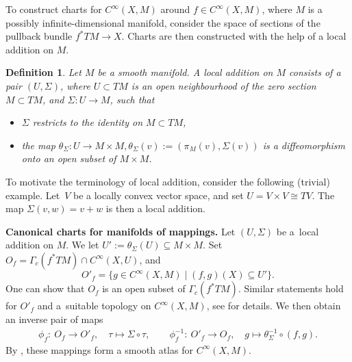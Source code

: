 \documentclass[pdftex]{sigma}
\numberwithin{equation}{section}
\newtheorem{Definition}[Theorem]{Definition}
\newtheorem{setup}[Theorem]{}
\begin{document}
To construct charts for $C^{\infty}(X,M)$ around $f \in C^{\infty}(X,M)$, where $M$ is a possibly infinite-dimensional manifold, consider the space of sections of the pullback bundle $f^{*}TM \rightarrow X$. Charts are then constructed with the help of a local addition on $M$.

\begin{Definition}%
 Let $M$ be a smooth manifold.
 A \emph{local addition} on $M$ consists of a pair $(U,\Sigma)$, where $U \subset TM$ is an open neighbourhood of the zero section $M \subset TM$, and $\Sigma \colon U \rightarrow M$,
 such that
 \begin{itemize}\itemsep=0pt
 \item $\Sigma$ restricts to the identity on $M \subset TM$,
 \item the map $\theta_\Sigma \colon U \rightarrow M \times M, \theta_\Sigma (v) := (\pi_M(v), \Sigma(v))$ is a diffeomorphism onto an open subset of $M \times M$.
 \end{itemize}
\end{Definition}

To motivate the terminology of local addition, consider the following (trivial) example. Let~$V$ be a locally convex vector space, and set $U = V \times V \cong TV$. The map $\Sigma (v,w) = v+w$ is then a local addition.


{\bf Canonical charts for manifolds of mappings.}
Let $(U,\Sigma)$ be a~local addition on $M$.
We let $U' := \theta_\Sigma (U) \subseteq M \times M$.
Set $O_{f} = \Gamma_c(f^{*}TM) \cap C^{\infty}(X, U)$, and
\begin{equation*}
 O'_{f} = \bigl\{ g \in C^{\infty}(X,M) \mid (f,g)(X) \subseteq U' \bigr\}.
\end{equation*}
One can show that $O_{f}$ is an open subset of $\Gamma_c(f^\ast TM)$. Similar statements hold for $O'_f$ and a~suitable topology on $C^\infty(X,M)$, see \cite[proof of Theorem~1.4]{GaS22} for details.
We then obtain an inverse pair of maps
\begin{align}\label{eq:can_charts}
 \phi_{f}\colon\ O_{f}\rightarrow O'_{f},\quad \tau \mapsto \Sigma \circ \tau, \qquad
 \phi_{f}^{-1}\colon\ O'_{f} \rightarrow O_{f},\quad g \mapsto \theta_{\Sigma}^{-1} \circ (f,g).
\end{align}
By \cite[Theorem~1.4]{GaS22}, these mappings form a smooth atlas for $C^{\infty}(X,M)$.
\end{document}
